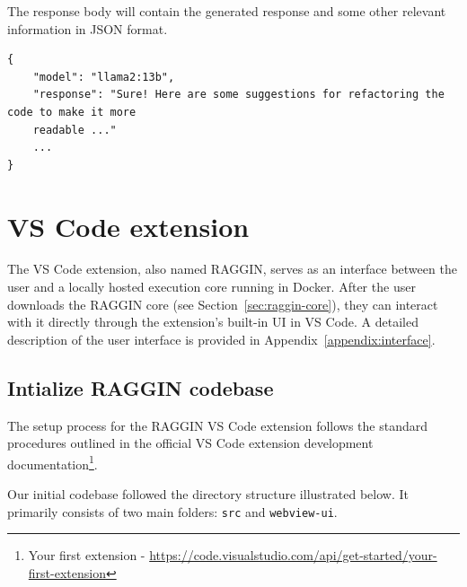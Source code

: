 The response body will contain the generated response and some other relevant information in JSON format.

\begin{lstlisting}[caption=POST /prompt/generate output example]
{
    "model": "llama2:13b",
    "response": "Sure! Here are some suggestions for refactoring the code to make it more 
    readable ..."
    ...
}
\end{lstlisting}


\section{VS Code extension}
\label{sec:VS Code Extension}
The VS Code extension, also named RAGGIN, serves as an interface between the user and a locally hosted execution core running in Docker. After the user downloads the RAGGIN core (see Section~\ref{sec:raggin-core}), they can interact with it directly through the extension’s built-in UI in VS Code. A detailed description of the user interface is provided in Appendix~\ref{appendix:interface}.

\subsection{Intialize RAGGIN codebase}
The setup process for the RAGGIN VS Code extension follows the standard procedures outlined in the official VS Code extension development documentation\footnote{Your first extension - \url{https://code.visualstudio.com/api/get-started/your-first-extension}}.


Our initial codebase followed the directory structure illustrated below. It primarily consists of two main folders: \texttt{src} and \texttt{webview-ui}.

